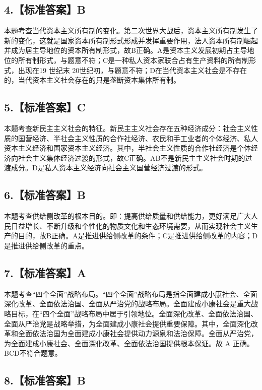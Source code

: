 \documentclass[UTF8,11pt]{ctexart}
\begin{document}
\subsection*{4.【标准答案】B}

本题考查当代资本主义所有制的变化。第二次世界大战后，资本主义所有制发生了新的变化，这就是国家资本所有制形式形成并发挥重要作用，法人资本所有制崛起并成为居主导地位的资本所有制形式，故B正确。A是资本主义发展初期占主导地位的所有制形式，与题意不符；C是一种私人资本家联合占有生产资料的所有制形式，出现在19 世纪末 20世纪初，与题意不符；D在当代资本主义社会是不存在的，当代资本主义社会存在的只是垄断资本集体所有制。


\subsection*{5.【标准答案】C}

本题考查新民主主义社会的特征。新民主主义社会存在五种经济成分：社会主义性质的国营经济、半社会主义性质的合作社经济、农民和手工业者的个体经济、私人资本主义经济和国家资本主义经济。其中，半社会主义性质的合作社经济是个体经济向社会主义集体经济过渡的形式，故C正确。AB不是新民主主义社会时期的过渡成分。D是私人资本主义经济向社会主义国营经济过渡的形式。


\subsection*{6.【标准答案】B}

本题考查供给侧改革的根本目的。即：提高供给质量和供给能力，更好满足广大人民日益增长、不断升级和个性化的物质文化和生态环境需要，从而实现社会主义生产的目的，故B正确。A是推进供给侧改革的条件；C是推进供给侧改革的内容；D是推进供给侧改革的重点。


\subsection*{7.【标准答案】A}

本题考查“四个全面”战略布局。“四个全面”战略布局是指全面建成小康社会、全面深化改革、全面依法治国、全面从严治党的战略布局。全面建成小康社会是重大战略目标，在“四个全面”战略布局中居于引领地位。全面深化改革、全面依法治国、全面从严治党是战略举措，为全面建成小康社会提供重要保障。其中，全面深化改革和全面依法治国为全面建成小康社会提供动力源泉和法治保障。全面从严治党，为全面建成小康社会、全面深化改革、全面依法治国提供根本保证。故 A 正确。BCD不符合题意。


\subsection*{8.【标准答案】B}
\end{document}

